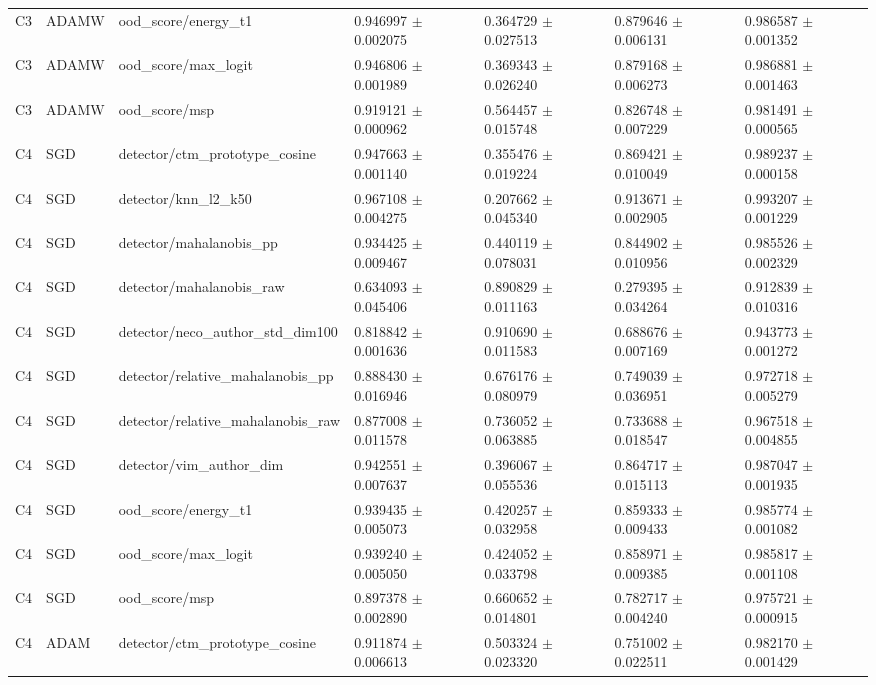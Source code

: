 \begin{longtable}{lllllll}
C3 & ADAMW & ood\_score/energy\_t1 & 0.946997 $\pm$ 0.002075 & 0.364729 $\pm$ 0.027513 & 0.879646 $\pm$ 0.006131 & 0.986587 $\pm$ 0.001352 \\
C3 & ADAMW & ood\_score/max\_logit & 0.946806 $\pm$ 0.001989 & 0.369343 $\pm$ 0.026240 & 0.879168 $\pm$ 0.006273 & 0.986881 $\pm$ 0.001463 \\
C3 & ADAMW & ood\_score/msp & 0.919121 $\pm$ 0.000962 & 0.564457 $\pm$ 0.015748 & 0.826748 $\pm$ 0.007229 & 0.981491 $\pm$ 0.000565 \\
C4 & SGD & detector/ctm\_prototype\_cosine & 0.947663 $\pm$ 0.001140 & 0.355476 $\pm$ 0.019224 & 0.869421 $\pm$ 0.010049 & 0.989237 $\pm$ 0.000158 \\
C4 & SGD & detector/knn\_l2\_k50 & 0.967108 $\pm$ 0.004275 & 0.207662 $\pm$ 0.045340 & 0.913671 $\pm$ 0.002905 & 0.993207 $\pm$ 0.001229 \\
C4 & SGD & detector/mahalanobis\_pp & 0.934425 $\pm$ 0.009467 & 0.440119 $\pm$ 0.078031 & 0.844902 $\pm$ 0.010956 & 0.985526 $\pm$ 0.002329 \\
C4 & SGD & detector/mahalanobis\_raw & 0.634093 $\pm$ 0.045406 & 0.890829 $\pm$ 0.011163 & 0.279395 $\pm$ 0.034264 & 0.912839 $\pm$ 0.010316 \\
C4 & SGD & detector/neco\_author\_std\_dim100 & 0.818842 $\pm$ 0.001636 & 0.910690 $\pm$ 0.011583 & 0.688676 $\pm$ 0.007169 & 0.943773 $\pm$ 0.001272 \\
C4 & SGD & detector/relative\_mahalanobis\_pp & 0.888430 $\pm$ 0.016946 & 0.676176 $\pm$ 0.080979 & 0.749039 $\pm$ 0.036951 & 0.972718 $\pm$ 0.005279 \\
C4 & SGD & detector/relative\_mahalanobis\_raw & 0.877008 $\pm$ 0.011578 & 0.736052 $\pm$ 0.063885 & 0.733688 $\pm$ 0.018547 & 0.967518 $\pm$ 0.004855 \\
C4 & SGD & detector/vim\_author\_dim & 0.942551 $\pm$ 0.007637 & 0.396067 $\pm$ 0.055536 & 0.864717 $\pm$ 0.015113 & 0.987047 $\pm$ 0.001935 \\
C4 & SGD & ood\_score/energy\_t1 & 0.939435 $\pm$ 0.005073 & 0.420257 $\pm$ 0.032958 & 0.859333 $\pm$ 0.009433 & 0.985774 $\pm$ 0.001082 \\
C4 & SGD & ood\_score/max\_logit & 0.939240 $\pm$ 0.005050 & 0.424052 $\pm$ 0.033798 & 0.858971 $\pm$ 0.009385 & 0.985817 $\pm$ 0.001108 \\
C4 & SGD & ood\_score/msp & 0.897378 $\pm$ 0.002890 & 0.660652 $\pm$ 0.014801 & 0.782717 $\pm$ 0.004240 & 0.975721 $\pm$ 0.000915 \\
C4 & ADAM & detector/ctm\_prototype\_cosine & 0.911874 $\pm$ 0.006613 & 0.503324 $\pm$ 0.023320 & 0.751002 $\pm$ 0.022511 & 0.982170 $\pm$ 0.001429 \\

\end{longtable}
